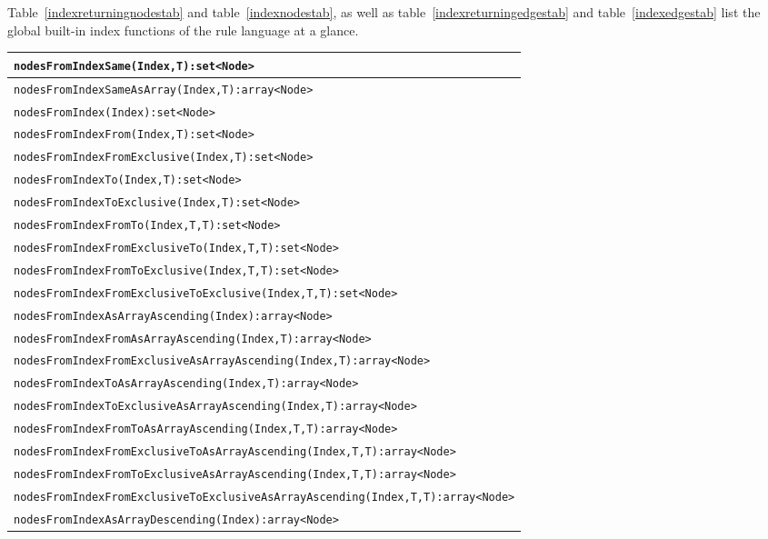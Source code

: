 Table~\ref{indexreturningnodestab} and table~\ref{indexnodestab}, as well as table~\ref{indexreturningedgestab} and table~\ref{indexedgestab} list the global built-in index functions of the rule language at a glance.

\begin{table}[htbp]
\centering
\begin{tabular}{|l|}
\hline
\texttt{nodesFromIndexSame(Index,T):set<Node>}\\
\hline
\texttt{nodesFromIndexSameAsArray(Index,T):array<Node>}\\
\hline
\texttt{nodesFromIndex(Index):set<Node>}\\
\texttt{nodesFromIndexFrom(Index,T):set<Node>}\\
\texttt{nodesFromIndexFromExclusive(Index,T):set<Node>}\\
\texttt{nodesFromIndexTo(Index,T):set<Node>}\\
\texttt{nodesFromIndexToExclusive(Index,T):set<Node>}\\
\texttt{nodesFromIndexFromTo(Index,T,T):set<Node>}\\
\texttt{nodesFromIndexFromExclusiveTo(Index,T,T):set<Node>}\\
\texttt{nodesFromIndexFromToExclusive(Index,T,T):set<Node>}\\
\texttt{nodesFromIndexFromExclusiveToExclusive(Index,T,T):set<Node>}\\
\hline
\texttt{nodesFromIndexAsArrayAscending(Index):array<Node>}\\
\texttt{nodesFromIndexFromAsArrayAscending(Index,T):array<Node>}\\
\texttt{nodesFromIndexFromExclusiveAsArrayAscending(Index,T):array<Node>}\\
\texttt{nodesFromIndexToAsArrayAscending(Index,T):array<Node>}\\
\texttt{nodesFromIndexToExclusiveAsArrayAscending(Index,T):array<Node>}\\
\texttt{nodesFromIndexFromToAsArrayAscending(Index,T,T):array<Node>}\\
\texttt{nodesFromIndexFromExclusiveToAsArrayAscending(Index,T,T):array<Node>}\\
\texttt{nodesFromIndexFromToExclusiveAsArrayAscending(Index,T,T):array<Node>}\\
\texttt{nodesFromIndexFromExclusiveToExclusiveAsArrayAscending(Index,T,T):array<Node>}\\
\hline
\texttt{nodesFromIndexAsArrayDescending(Index):array<Node>}\\

\end{tabular}
\end{table}
